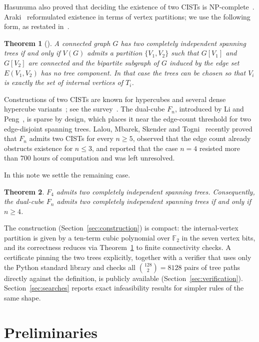 \documentclass[11pt]{article}
\newtheorem{theorem}{Theorem}
\theoremstyle{remark}
\begin{document}
Hasunuma also proved that deciding the existence of two CISTs is
NP-complete~\cite{Hasunuma2002}. Araki~\cite{Araki2014} reformulated
existence in terms of vertex partitions; we use the following form, as
restated in~\cite{QinHaoWu2022}.

\begin{theorem}[\cite{Araki2014}]\label{thm:araki}
A connected graph $G$ has two completely independent spanning trees if and
only if $V(G)$ admits a partition $\{V_1,V_2\}$ such that $G[V_1]$ and
$G[V_2]$ are connected and the bipartite subgraph of $G$ induced by the
edge set $E(V_1,V_2)$ has no tree component. In that case the trees can be
chosen so that $V_i$ is exactly the set of internal vertices of $T_i$.
\end{theorem}

Constructions of two CISTs are known for hypercubes and several dense
hypercube variants~\cite{PaiChang2016}; see the survey~\cite{ChengWangFan2023}.
The dual-cube $F_n$, introduced by Li and Peng~\cite{LiPeng2000}, is sparse
by design, which places it near the edge-count threshold for two
edge-disjoint spanning trees. Lalou, Mbarek, Skender and
Togni~\cite{Lalou2026} recently proved that $F_n$ admits two CISTs for
every $n\ge 5$, observed that the edge count already obstructs existence
for $n\le 3$, and reported that the case $n=4$ resisted more than $700$
hours of computation and was left unresolved.

In this note we settle the remaining case.

\begin{theorem}\label{thm:main}
$F_4$ admits two completely independent spanning trees. Consequently, the
dual-cube $F_n$ admits two completely independent spanning trees if and
only if $n\ge 4$.
\end{theorem}

The construction (Section~\ref{sec:construction}) is compact: the
internal-vertex partition is given by a ten-term cubic polynomial over
$\mathbb{F}_2$ in the seven vertex bits, and its correctness reduces via
Theorem~\ref{thm:araki} to finite connectivity checks. A certificate
pinning the two trees explicitly, together with a verifier that uses only
the Python standard library and checks all $\binom{128}{2}=8128$ pairs of
tree paths directly against the definition, is publicly available
(Section~\ref{sec:verification}). Section~\ref{sec:searches} reports exact
infeasibility results for simpler rules of the same shape.

\section{Preliminaries}\label{sec:prelim}
\end{document}
